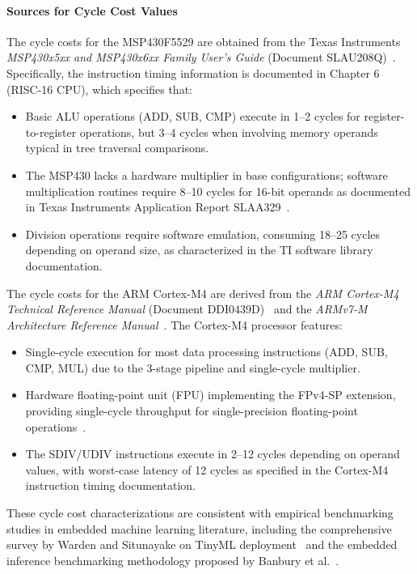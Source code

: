 \paragraph{Sources for Cycle Cost Values}
The cycle costs for the MSP430F5529 are obtained from the Texas Instruments \textit{MSP430x5xx and MSP430x6xx Family User's Guide} (Document SLAU208Q)~\cite{ti_msp430_userguide}. Specifically, the instruction timing information is documented in Chapter 6 (RISC-16 CPU), which specifies that:
\begin{itemize}
    \item Basic ALU operations (ADD, SUB, CMP) execute in 1--2 cycles for register-to-register operations, but 3--4 cycles when involving memory operands typical in tree traversal comparisons.
    \item The MSP430 lacks a hardware multiplier in base configurations; software multiplication routines require 8--10 cycles for 16-bit operands as documented in Texas Instruments Application Report SLAA329~\cite{ti_msp430_multiply}.
    \item Division operations require software emulation, consuming 18--25 cycles depending on operand size, as characterized in the TI software library documentation.
\end{itemize}

The cycle costs for the ARM Cortex-M4 are derived from the \textit{ARM Cortex-M4 Technical Reference Manual} (Document DDI0439D)~\cite{arm_cortexm4_trm} and the \textit{ARMv7-M Architecture Reference Manual}~\cite{arm_armv7m_arm}. The Cortex-M4 processor features:
\begin{itemize}
    \item Single-cycle execution for most data processing instructions (ADD, SUB, CMP, MUL) due to the 3-stage pipeline and single-cycle multiplier.
    \item Hardware floating-point unit (FPU) implementing the FPv4-SP extension, providing single-cycle throughput for single-precision floating-point operations~\cite{arm_cortexm4_fpu}.
    \item The SDIV/UDIV instructions execute in 2--12 cycles depending on operand values, with worst-case latency of 12 cycles as specified in the Cortex-M4 instruction timing documentation.
\end{itemize}

These cycle cost characterizations are consistent with empirical benchmarking studies in embedded machine learning literature, including the comprehensive survey by Warden and Situnayake on TinyML deployment~\cite{warden2019tinyml} and the embedded inference benchmarking methodology proposed by Banbury et al.~\cite{banbury2021mlperf}.

